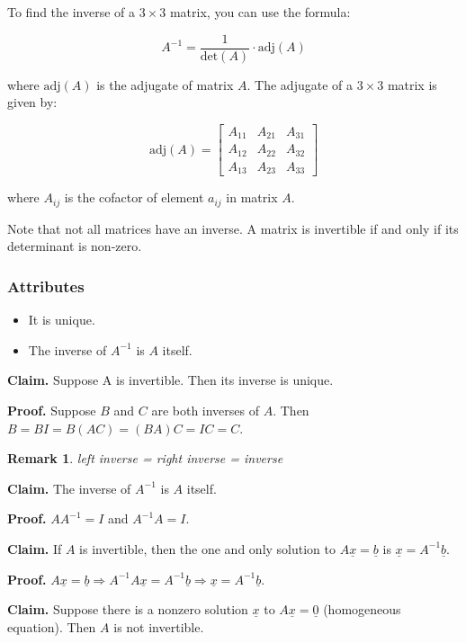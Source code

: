 \documentclass[12pt,a4paper]{article}
\newtheorem*{rem}{Remark}
\newcommand{\Remark}[1]{
  \begin{rem}
    \color{cyan}
    #1
  \end{rem}
}
\begin{document}
To find the inverse of a $3 \times 3$ matrix, you can use the formula:

\[
A^{-1} = \frac{1}{{\text{det}(A)}} \cdot \text{adj}(A)
\]

where $\text{adj}(A)$ is the adjugate of matrix $A$. The adjugate of a $3 \times 3$ matrix is given by:

\[
\text{adj}(A) = \begin{bmatrix}
A_{11} & A_{21} & A_{31} \\
A_{12} & A_{22} & A_{32} \\
A_{13} & A_{23} & A_{33}
\end{bmatrix}
\]

where $A_{ij}$ is the cofactor of element $a_{ij}$ in matrix $A$.

Note that not all matrices have an inverse. A matrix is invertible if and only if its determinant is non-zero.

\subsubsection*{Attributes}

\begin{itemize}
  \item It is unique.
  \item The inverse of $A^{-1}$ is $A$ itself.
\end{itemize}

\hrulefill

\textbf{Claim.} Suppose A is invertible. Then its inverse is unique.

\textbf{Proof.} Suppose $B$ and $C$ are both inverses of $A$.
Then $B = BI = B(AC) = (BA)C = IC = C$.

\Remark{left inverse = right inverse = inverse}

\textbf{Claim.} The inverse of $A^{-1}$ is $A$ itself.

\textbf{Proof.} $AA^{-1} = I$ and $A^{-1}A = I$.

\textbf{Claim.} If $A$ is invertible, then the one and only solution to $A\underline{x} = \underline{b}$ is $\underline{x} = A^{-1}\underline{b}$.

\textbf{Proof.} $A\underline{x} = \underline{b} \Rightarrow A^{-1}A\underline{x} = A^{-1}\underline{b} \Rightarrow \underline{x} = A^{-1}\underline{b}$.

\textbf{Claim.} Suppose there is a nonzero solution $\underline{x}$ to $A\underline{x} = \underline{0}$ (homogeneous equation).
Then $A$ is not invertible.
\end{document}
